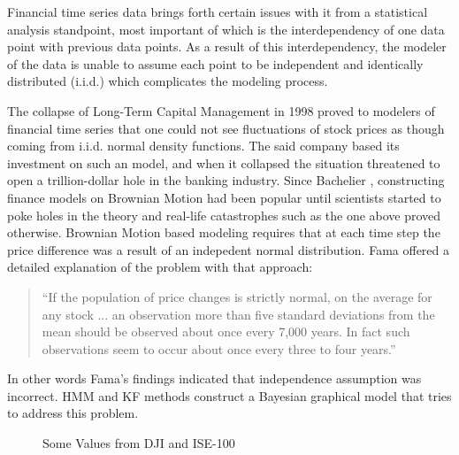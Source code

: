 Financial time series data brings forth certain issues with it from a
statistical analysis standpoint, most important of which is the interdependency
of one data point with previous data points. As a result of this
interdependency, the modeler of the data is unable to assume each point to be
independent and identically distributed (i.i.d.) which complicates the modeling
process.

The collapse of Long-Term Capital Management in 1998 proved to modelers of
financial time series that one could not see fluctuations of stock prices as
though coming from i.i.d. normal density functions. The said company based its
investment on such an model, and when it collapsed the situation threatened to
open a trillion-dollar hole in the banking industry. Since Bachelier
\cite{bachelier}, constructing finance models on Brownian Motion had been
popular until scientists started to poke holes in the theory and real-life
catastrophes such as the one above proved otherwise. Brownian Motion based
modeling requires that at each time step the price difference was a result of an
indepedent normal distribution. Fama \cite{fama} offered a detailed explanation
of the problem with that approach:

\begin{quote}
``If the population of price changes is strictly normal, on the average for any
stock ... an observation more than five standard deviations from the mean
should be observed about once every 7,000 years. In fact such observations
seem to occur about once every three to four years.''
\end{quote}

In other words Fama's findings indicated that independence assumption was
incorrect. HMM and KF methods construct a Bayesian graphical model that tries to
address this problem.

\begin{figure}[ht]
\caption{Some Values from DJI and ISE-100}
\vspace{0.6cm}
\end{figure}

